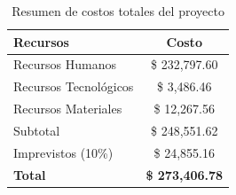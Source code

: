\begin{table}[htbp]
    \centering
    \caption[Resumen de costos totales del proyecto]{Resumen de costos totales del proyecto}
    \label{tab:flujo_pago}
    \begin{tabular}{|l|c|}
        \hline
        \textbf{Recursos} & \textbf{Costo} \\ \hline
        Recursos Humanos & \$ 232,797.60 \\ \hline
        Recursos Tecnológicos & \$ 3,486.46 \\ \hline
        Recursos Materiales & \$ 12,267.56 \\ \hline
        Subtotal & \$ 248,551.62 \\ \hline
        Imprevistos (10\%) & \$ 24,855.16 \\ \hline
        \textbf{Total} & \textbf{\$ 273,406.78} \\ \hline
    \end{tabular}
\end{table}


